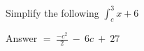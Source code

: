 Simplify the following \(\int_{c}^{3}{x + 6}\)

Answer \(= \ \frac{{- c}^{2}}{2}\  - \ 6c\  + \ 27\)
